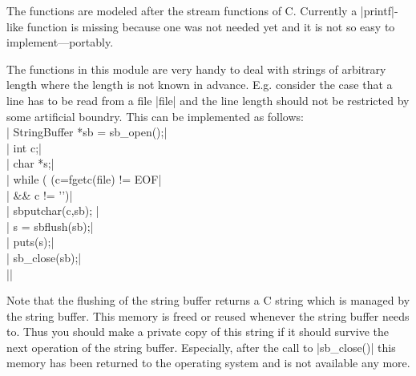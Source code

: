 The functions are modeled after the stream functions of C.
Currently a |printf|-like function is missing because one was
not needed yet and it is not so easy to implement---portably. 

The functions in this module are very handy to deal with
strings of arbitrary length where the length is not known in
advance. E.g. consider the case that a line has to be read
from a file |file| and the line length should not be restricted by
some artificial boundry. This can be implemented as follows:
\\
|{ StringBuffer *sb = sb_open();|\\
|  int c;|\\
|  char *s;|\\
|  while ( (c=fgetc(file) != EOF|\\
|          && c != '\n')|\\
|  { sbputchar(c,sb); }|\\
|  s = sbflush(sb);|\\
|  puts(s);|\\
|  sb_close(sb);|\\
|}|

Note that the flushing of the string buffer returns a C string
which is managed by the string buffer.  This memory is freed
or reused whenever the string buffer needs to. Thus you should
make a private copy of this string if it should survive the
next operation of the string buffer. Especially, after the
call to |sb_close()| this memory has been returned to the
operating system and is not available any more.

